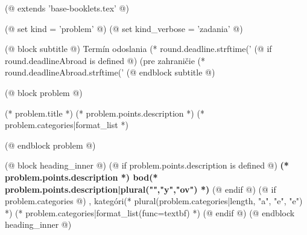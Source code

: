 (@ extends 'base-booklets.tex' @)

(@ set kind = 'problem' @)
(@ set kind_verbose = 'zadania' @)

(@ block subtitle @)
    {
        \centering
        \vspace*{-5mm}
        Termín odoslania (* round.deadline.strftime('%
        (@ if round.deadlineAbroad is defined @) (pre zahraničie (* round.deadlineAbroad.strftime('%
    }
(@ endblock subtitle @)

(@ block problem @)
    \begin{seminar-problem}{(* problem.title *)}%
        {(* problem.points.description *)}%
        {(* problem.categories|format_list *)}
    \end{seminar-problem}
(@ endblock problem @)

(@ block heading_inner @)
    (@ if problem.points.description is defined @)%
        \textbf{(* problem.points.description *) bod(* problem.points.description|plural("","y","ov") *)}%
    (@ endif @)%
    (@ if problem.categories @)%
        , kategóri(* plural(problem.categories|length, "a", "e", "e") *) (* problem.categories|format_list(func=textbf) *)%
    (@ endif @)%
(@ endblock heading_inner @)

